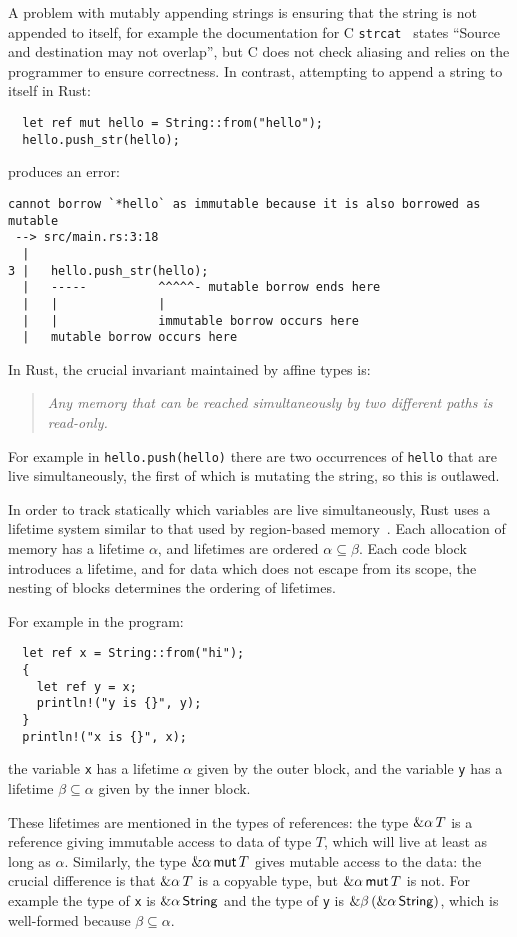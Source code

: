 A problem with mutably appending strings is ensuring that the string
is not appended to itself, for example the documentation for
C \verb|strcat|~\cite{strcat} states ``Source and destination may not
overlap'', but C does not check aliasing and relies on the programmer
to ensure correctness. In contrast, attempting to append a string
to itself in Rust:
\begin{verbatim}
  let ref mut hello = String::from("hello");
  hello.push_str(hello);
\end{verbatim}
produces an error:
\begin{verbatim}
cannot borrow `*hello` as immutable because it is also borrowed as mutable
 --> src/main.rs:3:18
  |
3 |   hello.push_str(hello);
  |   -----          ^^^^^- mutable borrow ends here
  |   |              |
  |   |              immutable borrow occurs here
  |   mutable borrow occurs here
\end{verbatim}
In Rust, the crucial invariant maintained by affine types is:
\begin{quote}\em
  Any memory that can be reached simultaneously by two different paths
  is read-only.
\end{quote}
For example in \verb|hello.push(hello)| there are two occurrences of \verb|hello| that
are live simultaneously, the first of which is mutating the string, so this is outlawed.

In order to track statically which variables are live simultaneously, Rust uses a lifetime
system similar to that used by region-based memory~\cite{regions}. Each allocation of
memory has a lifetime $\alpha$, and lifetimes are ordered $\alpha\subseteq\beta$.
Each code block introduces a lifetime, and for data which does not escape from its scope,
the nesting of blocks determines the ordering of lifetimes.

For example in the program:
\begin{verbatim}
  let ref x = String::from("hi");
  {
    let ref y = x;
    println!("y is {}", y);
  }
  println!("x is {}", x);
\end{verbatim}
the variable \verb|x| has a lifetime $\alpha$ given by the outer block,
and the variable \verb|y| has a lifetime $\beta\subseteq\alpha$ given by the inner block.

These lifetimes are mentioned in the types of references: the type $\&\alpha\, T$
is a reference giving immutable access to data of type $T$, which will live at least as long as
$\alpha$. Similarly, the type $\&\alpha\,\mathsf{mut}\, T$ gives mutable access to the data: the crucial
difference is that $\&\alpha\, T$ is a copyable type, but $\&\alpha\,\mathsf{mut}\, T$ is not.
For example
the type of \verb|x| is $\&\alpha\,\mathsf{String}$ and the type of \verb|y| is
$\&\beta\,(\&\alpha\,\mathsf{String})$, which is well-formed because $\beta\subseteq\alpha$.
